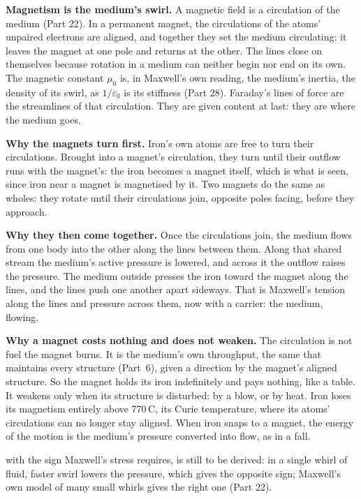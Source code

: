 \begin{hypbar}
\textbf{Magnetism is the medium's swirl.} A magnetic field is a circulation of the medium (Part 22).\footnotemark{} In a permanent magnet, the circulations of the atoms' unpaired electrons are aligned, and together they set the medium circulating: it leaves the magnet at one pole and returns at the other. The lines close on themselves because rotation in a medium can neither begin nor end on its own. The magnetic constant $\mu_0$ is, in Maxwell's own reading, the medium's inertia, the density of its swirl, as $1/\varepsilon_0$ is its stiffness (Part 28). Faraday's lines of force are the streamlines of that circulation. They are given content at last: they are where the medium goes.

\textbf{Why the magnets turn first.} Iron's own atoms are free to turn their circulations. Brought into a magnet's circulation, they turn until their outflow runs with the magnet's: the iron becomes a magnet itself, which is what is seen, since iron near a magnet is magnetised by it. Two magnets do the same as wholes: they rotate until their circulations join, opposite poles facing, before they approach.

\textbf{Why they then come together.} Once the circulations join, the medium flows from one body into the other along the lines between them. Along that shared stream the medium's active pressure is lowered, and across it the outflow raises the pressure. The medium outside presses the iron toward the magnet along the lines, and the lines push one another apart sideways. That is Maxwell's tension along the lines and pressure across them, now with a carrier: the medium, flowing.

\textbf{Why a magnet costs nothing and does not weaken.} The circulation is not fuel the magnet burns. It is the medium's own throughput, the same that maintains every structure (Part~6), given a direction by the magnet's aligned structure. So the magnet holds its iron indefinitely and pays nothing, like a table. It weakens only when its structure is disturbed: by a blow, or by heat. Iron loses its magnetism entirely above 770\,\textdegree C, its Curie temperature, where its atoms' circulations can no longer stay aligned. When iron snaps to a magnet, the energy of the motion is the medium's pressure converted into flow, as in a fall.
\end{hypbar}

 with the sign Maxwell's stress requires, is still to be derived: in a single whirl of fluid, faster swirl lowers the pressure, which gives the opposite sign; Maxwell's own model of many small whirls gives the right one (Part 22).

